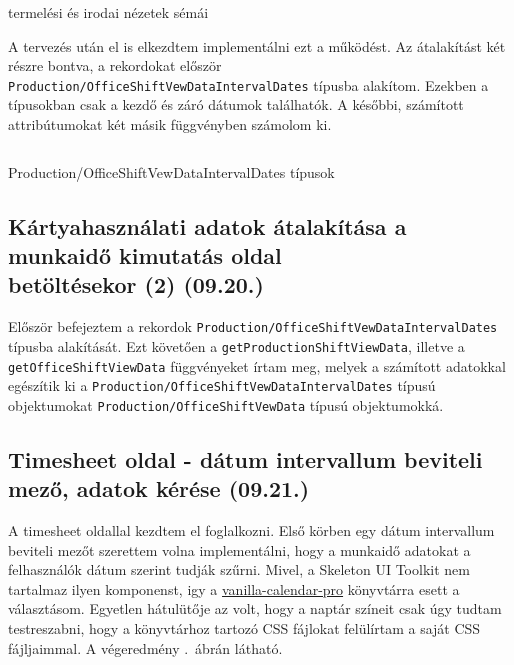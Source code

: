 \documentclass[a4paper]{article}
\newcommand{\inlts}[1]{\texttt{#1}}
\begin{document}
\begin{listing}[!ht]
\inputminted[bgcolor=codebg, breaklines, breakanywhere, fontsize=\small]{typescript}{code/shiftViewData.ts}
\caption{termelési és irodai nézetek sémái}
\label{listing:9}
\end{listing}

A tervezés után el is elkezdtem implementálni ezt a működést. Az átalakítást két részre bontva, a
rekordokat először \inlts{Production/OfficeShiftVewDataIntervalDates} típusba alakítom.
Ezekben a típusokban csak a kezdő és záró dátumok találhatók. A későbbi, számított attribútumokat
két másik függvényben számolom ki.

\begin{listing}[!ht]
\inputminted[bgcolor=codebg, breaklines, breakanywhere, fontsize=\small]{typescript}{code/shiftViewDataIntervalDates.ts}
\caption{Production/OfficeShiftVewDataIntervalDates típusok}
\label{listing:10}
\end{listing}

\subsection{Kártyahasználati adatok átalakítása a munkaidő kimutatás oldal\\ betöltésekor (2) (09.20.)}

Először befejeztem a rekordok \inlts{Production/OfficeShiftVewDataIntervalDates}
típusba alakítását. Ezt követően a \inlts{getProductionShiftViewData}, illetve a
\inlts{getOfficeShiftViewData} függvényeket írtam meg, melyek a számított adatokkal egészítik ki a
\inlts{Production/OfficeShiftVewDataIntervalDates} típusú objektumokat
\inlts{Production/OfficeShiftVewData} típusú objektumokká.

\subsection{Timesheet oldal - dátum intervallum beviteli mező, adatok kérése (09.21.)}

A timesheet oldallal kezdtem el foglalkozni. Első körben egy dátum intervallum beviteli mezőt
szerettem volna implementálni, hogy a munkaidő adatokat a felhasználók dátum szerint tudják szűrni.
Mivel, a Skeleton UI Toolkit nem tartalmaz ilyen komponenst, igy a \href{https://vanilla-calendar.pro/}{vanilla-calendar-pro} könyvtárra
esett a választásom. Egyetlen hátulütője az volt, hogy a naptár színeit csak úgy tudtam testreszabni,
hogy a könyvtárhoz tartozó CSS fájlokat felülírtam a saját CSS fájljaimmal. A végeredmény .~ábrán
látható.\\
\end{document}
